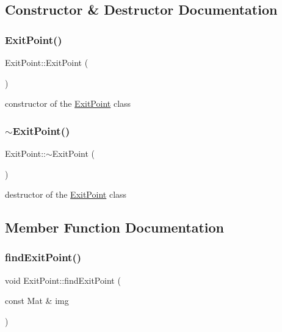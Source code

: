 \subsection{Constructor \& Destructor Documentation}
\mbox{\label{class_exit_point_ae472f935e952356c9bfe64298474d523}} 
\subsubsection{\texorpdfstring{Exit\+Point()}{ExitPoint()}}
{\footnotesize\ttfamily Exit\+Point\+::\+Exit\+Point (\begin{DoxyParamCaption}{ }\end{DoxyParamCaption})}

constructor of the \mbox{\hyperlink{class_exit_point}{Exit\+Point}} class \mbox{\label{class_exit_point_aa764fee5b37cb7dbda6f2fde39ffbc05}} 
\subsubsection{\texorpdfstring{$\sim$\+Exit\+Point()}{~ExitPoint()}}
{\footnotesize\ttfamily Exit\+Point\+::$\sim$\+Exit\+Point (\begin{DoxyParamCaption}{ }\end{DoxyParamCaption})}

destructor of the \mbox{\hyperlink{class_exit_point}{Exit\+Point}} class 

\subsection{Member Function Documentation}
\mbox{\label{class_exit_point_a2762c0c61bbe71a1a292b86e9517e860}} 
\subsubsection{\texorpdfstring{find\+Exit\+Point()}{findExitPoint()}}
{\footnotesize\ttfamily void Exit\+Point\+::find\+Exit\+Point (\begin{DoxyParamCaption}\item[{const Mat \&}]{img }\end{DoxyParamCaption})}

